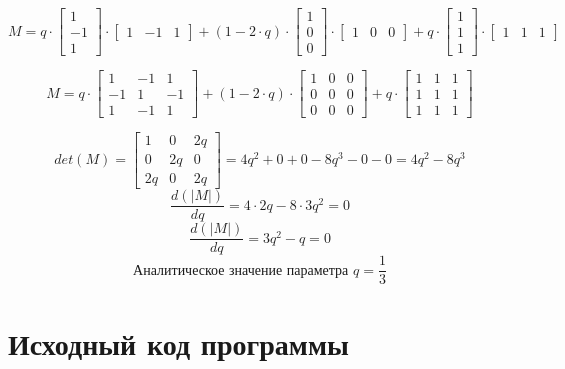 \[
	M = q \cdot
	\begin{bmatrix}
		 1		\\
		-1		\\
		 1
	\end{bmatrix}
	\cdot
	\begin{bmatrix}
	    1 & -1 & 1
	\end{bmatrix}
	+ (1 - 2\cdot q) \cdot
	\begin{bmatrix}
		1		\\
		0		\\
		0
	\end{bmatrix}
	\cdot
	\begin{bmatrix}
	    1 & 0 & 0
	\end{bmatrix}
	+ q \cdot
	\begin{bmatrix}
		1		\\
		1		\\
		1
	\end{bmatrix}
	\cdot
	\begin{bmatrix}
	    1 & 1 & 1
	\end{bmatrix}
\]


\[
	M = q \cdot
	\begin{bmatrix}
		 1		&	 -1		&		1	\\
		-1		&	  1		&     -1	\\
		 1		&	 -1		&		1
	\end{bmatrix}
	+ (1 - 2\cdot q) \cdot
	\begin{bmatrix}
		 1		&	  0		&		0	\\
		 0		&	  0		&      0	\\
		 0		&	  0		&		0
	\end{bmatrix}
	+ q \cdot
	\begin{bmatrix}
		 1		&	  1		&		1	\\
		 1		&	  1		&      1	\\
		 1		&	  1		&		1
	\end{bmatrix}
\]

\[
	det(M) =
	\begin{bmatrix}
		 1		&	  0		&	   2q	\\
		 0		&	 2q		&		0	\\
		2q		&	  0		&	   2q
	\end{bmatrix}
	= 4q^2 + 0 + 0 - 8q^3 - 0 - 0
	= 4q^2 - 8q^3
\]
\[ \frac{d(|M|)}{dq} = 4 \cdot 2 q - 8 \cdot 3 q^2 = 0 \]
\[ \frac{d(|M|)}{dq} = 3 q^2 - q = 0 \]
\[ \text{Аналитическое значение параметра } q = \frac{1}{3} \]


\section{Исходный код программы}
